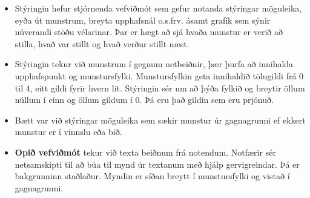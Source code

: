 \begin{enumerate}
\begin{itemize}
\begin{enumerate}
        \end{enumerate}
        \item Stýringin hefur stjórnenda vefviðmót sem gefur notanda stýringar möguleika, eyða út munstrum, breyta upphafsnál o.s.frv. ásamt grafík sem sýnir núverandi stöðu vélarinar. Þar er hægt að sjá hvaða munstur er verið að stilla, hvað var stillt og hvað verður stillt næst.
        \item Stýringin tekur við munstrum í gegnum netbeiðnir, þær þurfa að innihalda upphafspunkt og munstursfylki. Munstursfylkin geta innihaldið tölugildi frá 0 til 4, eitt gildi fyrir hvern lit. Stýringin sér um að þýða fylkið og breytir öllum núllum í einn og öllum gildum í 0. Þá eru það gildin sem eru prjónuð.
        \item Bætt var við stýringar möguleika sem sækir munstur úr gagnagrunni ef ekkert munstur er í vinnslu eða bið.
        \item     \textbf{Opið vefviðmót}
    tekur við texta beiðnum frá notendum. Notfærir sér netsamskipti til að búa til mynd úr textanum með hjálp gervigreindar. Þá er bakgrunninn staðlaður. Myndin er síðan breytt í munstursfylki og vistað í gagnagrunni.       
    \end{itemize}
\end{enumerate}
